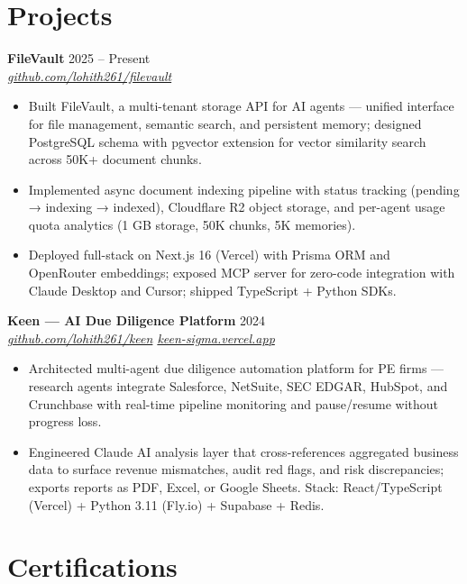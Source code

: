 \documentclass[10pt,letterpaper]{article}
\newcommand{\entry}[3]{%
  \vspace{3pt}\textbf{#1} \hfill #3 \\
  \textit{\small #2}\vspace{1pt}}
\begin{document}
\section{Projects}

\entry{FileVault}{\href{https://github.com/lohith261/filevault}{github.com/lohith261/filevault}}{2025 -- Present}
\begin{itemize}
  \item Built FileVault, a multi-tenant storage API for AI agents --- unified interface for file management, semantic search, and persistent memory; designed PostgreSQL schema with pgvector extension for vector similarity search across 50K+ document chunks.
  \item Implemented async document indexing pipeline with status tracking (pending → indexing → indexed), Cloudflare R2 object storage, and per-agent usage quota analytics (1 GB storage, 50K chunks, 5K memories).
  \item Deployed full-stack on Next.js 16 (Vercel) with Prisma ORM and OpenRouter embeddings; exposed MCP server for zero-code integration with Claude Desktop and Cursor; shipped TypeScript + Python SDKs.
\end{itemize}

\entry{Keen --- AI Due Diligence Platform}{\href{https://github.com/lohith261/keen}{github.com/lohith261/keen} \quad\textbullet\quad \href{https://keen-sigma.vercel.app/}{keen-sigma.vercel.app}}{2024}
\begin{itemize}
  \item Architected multi-agent due diligence automation platform for PE firms --- research agents integrate Salesforce, NetSuite, SEC EDGAR, HubSpot, and Crunchbase with real-time pipeline monitoring and pause/resume without progress loss.
  \item Engineered Claude AI analysis layer that cross-references aggregated business data to surface revenue mismatches, audit red flags, and risk discrepancies; exports reports as PDF, Excel, or Google Sheets. Stack: React/TypeScript (Vercel) + Python 3.11 (Fly.io) + Supabase + Redis.
\end{itemize}

\section{Certifications}
\end{document}
